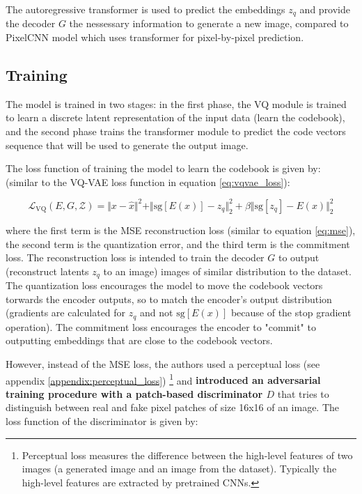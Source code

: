 The autoregressive transformer is used to predict the embeddings $z_q$ and provide the decoder $G$ the nessessary information to generate a new image, compared to PixelCNN model \cite{pixelcnn} which uses transformer for pixel-by-pixel prediction.




\subsection{Training}

The model is trained in two stages: in the first phase, the VQ module is trained to learn a discrete latent representation of the input data (learn the codebook), and the second phase trains the transformer module to predict the code vectors sequence that will be used to generate the output image.

The loss function of training the model to learn the codebook is given by: (similar to the VQ-VAE loss function in equation \ref{eq:vqvae_loss}):

\begin{equation}
    \mathcal{L}_{\text{VQ}} (E, G, \mathcal{Z}) = \Vert x - \hat{x} \Vert ^2 + \Vert \text{sg}[E(x)] - z_q \Vert ^2_2 +  \beta \Vert \text{sg}[z_q] - E(x) \Vert ^2_2
\end{equation}

where the first term is the MSE reconstruction loss (similar to equation \ref{eq:mse}), the second term is the quantization error, and the third term is the commitment loss. The reconstruction loss is intended to train the decoder $G$ to output (reconstruct latents $z_q$ to an image) images of similar distribution to the dataset. The quantization loss encourages the model to move the codebook vectors torwards the encoder outputs, so to match the encoder's output distribution (gradients are calculated for $z_q$ and not $\text{sg}[E(x)]$ because of the stop gradient operation). The commitment loss encourages the encoder to "commit" to outputting embeddings that are close to the codebook vectors.

However, instead of the MSE loss, the authors used a perceptual loss \cite{perceptual_loss} (see appendix \ref{appendix:perceptual_loss}) \footnote[4]{Perceptual loss measures the difference between the high-level features of two images (a generated image and an image from the dataset). Typically the high-level features are extracted by pretrained CNNs.} and \textbf{introduced an adversarial training procedure with a patch-based discriminator $D$} that tries to distinguish between real and fake pixel patches of size 16x16 of an image. The loss function of the discriminator is given by:

